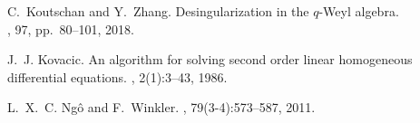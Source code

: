 \documentclass[10pt,a4paper]{article}
\begin{document}
\begin{thebibliography}{10}


C.~Koutschan and Y.~Zhang.
\newblock Desingularization in the $q$-Weyl algebra. \\
, 97, pp.\ 80–101, 2018. 

J.~J. Kovacic.
\newblock An algorithm for solving second order linear homogeneous differential
  equations.
, 2(1):3--43, 1986.


% 
% 
% 



L.~X.~C. {Ng\^o} and F.~Winkler.
, 79(3-4):573--587, 2011.



\end{thebibliography}
\end{document}
